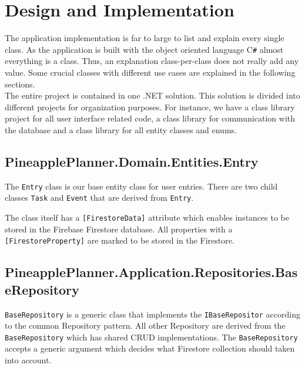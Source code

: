 \documentclass{article}
\begin{document}
\section{Design and Implementation}

The application implementation is far to large to list and explain every single class.
As the application is built with the object oriented language C\verb|#| almost everything is a class.
Thus, an explanation class-per-class does not really add any value.
Some crucial classes with different use cases are explained in the following sections.
\\
The entire project is contained in one .NET solution.
This solution is divided into different projects for organization purposes.
For instance, we have a class library project for all user interface related code, a class library for communication with the database and a class library for all entity classes and enums.

\subsection{PineapplePlanner.Domain.Entities.Entry}

The \verb|Entry| class is our base entity class for user entries.
There are two child classes \verb|Task| and \verb|Event| that are derived from \verb|Entry|.

The class itself has a \verb|[FirestoreData]| attribute which enables instances to be stored in the Firebase Firestore database.
All properties with a \verb|[FirestoreProperty]| are marked to be stored in the Firestore.


\bigbreak

\subsection{PineapplePlanner.Application.Repositories.BaseRepository}

\verb|BaseRepository| is a generic class that implements the \verb|IBaseRepositor| according to the common Repository pattern.
All other Repository are derived from the \verb|BaseRepository| which has shared CRUD implementations.
The \verb|BaseRepository| accepts a generic argument which decides what Firestore collection should taken into account.
\end{document}
